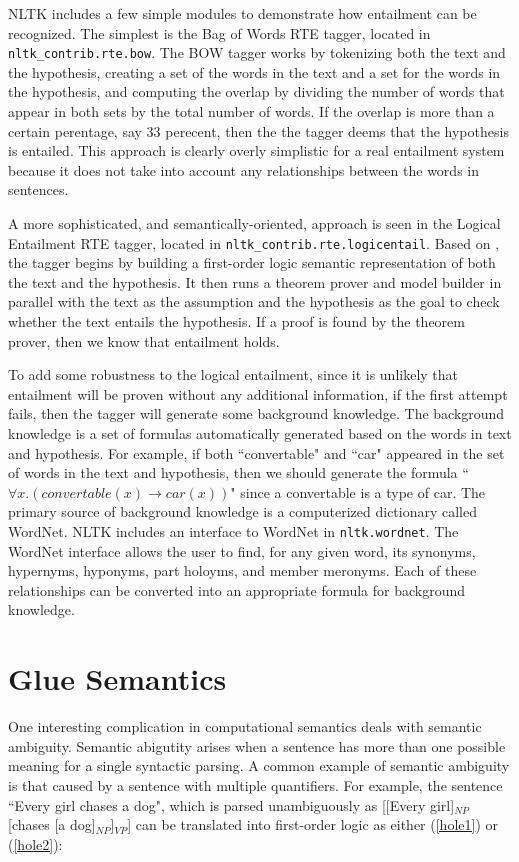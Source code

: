 \documentclass{article}
\newcommand{\dhgcode}[1]{{\tt #1}}
\begin{document}
NLTK includes a few simple modules to demonstrate how entailment can be recognized.  The simplest is the Bag of Words RTE tagger, located in \dhgcode{nltk\_contrib.rte.bow}.  The BOW tagger works by tokenizing both the text and the hypothesis, creating a set of the words in the text and a set for the words in the hypothesis, and computing the overlap by dividing the number of words that appear in both sets by the total number of words.  If the overlap is more than a certain perentage, say 33 perecent, then the the tagger deems that the hypothesis is entailed.  This approach is clearly overly simplistic for a real entailment system because it does not take into account any relationships between the words in sentences.

A more sophisticated, and semantically-oriented, approach is seen in the Logical Entailment RTE tagger, located in \dhgcode{nltk\_contrib.rte.logicentail}.  Based on \cite{BosRTE}, the tagger begins by building a first-order logic semantic representation of both the text and the hypothesis.  It then runs a theorem prover and model builder in parallel with the text as the assumption and the hypothesis as the goal to check whether the text entails the hypothesis.  If a proof is found by the theorem prover, then we know that entailment holds.

To add some robustness to the logical entailment, since it is unlikely that entailment will be proven without any additional information, if the first attempt fails, then the tagger will generate some background knowledge.  The background knowledge is a set of formulas automatically generated based on the words in text and hypothesis.  For example, if both ``convertable" and ``car" appeared in the set of words in the text and hypothesis, then we should generate the formula ``$\forall x.(convertable(x) \rightarrow car(x))$" since a convertable is a type of car.  The primary source of background knowledge is a computerized dictionary called WordNet.  NLTK includes an interface to WordNet in \dhgcode{nltk.wordnet}.  The WordNet interface allows the user to find, for any given word, its synonyms, hypernyms, hyponyms, part holoyms, and member meronyms.  Each of these relationships can be converted into an appropriate formula for background knowledge.


\section{Glue Semantics}
One interesting complication in computational semantics deals with semantic ambiguity.  Semantic abigutity arises when a sentence has more than one possible meaning for a single syntactic parsing.  A common example of semantic ambiguity is that caused by a sentence with multiple quantifiers.  For example, the sentence ``Every girl chases a dog", which is parsed unambiguously as [[Every girl]$_{NP}$ [chases [a dog]$_{NP}$]$_{VP}$] can be translated into first-order logic as either (\ref{hole1}) or (\ref{hole2}):
\end{document}
